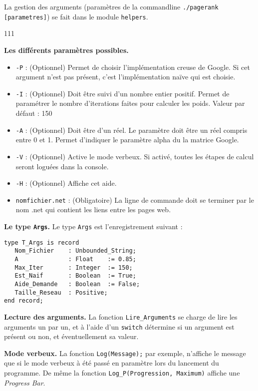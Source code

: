 La gestion des arguments (paramètres de la commandline \lstinline{./pagerank [parametres]}) se fait dans le module \lstinline{helpers}.
\begin{dinglist}{111}
   \item \textbf{Les différents paramètres possibles.}
   \begin{itemize}
      \item \lstinline{-P} : (Optionnel) Permet de choisir l'implémentation creuse de Google. Si cet argument n'est pas présent, c'est l'implémentation naïve qui est choisie.
      \item \lstinline{-I} : (Optionnel) Doit être suivi d'un nombre entier positif. Permet de paramétrer le nombre d'iterations faites pour calculer les poids. Valeur par défaut : 150
      \item \lstinline{-A} : (Optionnel) Doit être d'un réel. Le paramètre doit être un réel compris entre 0 et 1. Permet d'indiquer le paramètre alpha du la matrice Google.
      \item \lstinline{-V} : (Optionnel) Active le mode verbeux. Si activé, toutes les étapes de calcul seront loguées dans la console.
      \item \lstinline{-H} : (Optionnel) Affiche cet aide.
      \item \lstinline{nomfichier.net} : (Obligatoire) La ligne de commande doit se terminer par le nom .net qui contient les liens entre les pages web. 
   \end{itemize}
   \item \textbf{Le type \lstinline{Args}.} Le type \lstinline{Args} est l'enregistrement suivant :
\begin{lstlisting}[caption=Le type \lstinline{Args}]
type T_Args is record 
   Nom_Fichier    : Unbounded_String;
   A              : Float    := 0.85;
   Max_Iter       : Integer  := 150;
   Est_Naif       : Boolean  := True;
   Aide_Demande   : Boolean  := False;
   Taille_Reseau  : Positive;
end record;
\end{lstlisting}
   \item \textbf{Lecture des arguments.} La fonction \lstinline{Lire_Arguments} se charge de lire les arguments un par un, et à l'aide d'un
   \lstinline{switch} détermine si un argument est présent ou non, et éventuellement sa valeur.
   \item \textbf{Mode verbeux.} La fonction \lstinline{Log(Message);} par exemple, n'affiche le message que si le mode verbeux à été passé en paramètre lors du lancement du programme. De même la fonction 
   \lstinline{Log_P(Progression, Maximum)} affiche une \textit{Progress Bar}.

\end{dinglist}